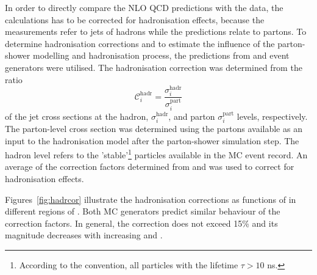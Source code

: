 In order to directly compare the NLO QCD predictions with the data, the calculations has to be corrected for hadronisation effects, because the measurements refer to jets of hadrons while the predictions relate to partons. To determine hadronisation corrections and to estimate the influence of the parton-shower modelling and hadronisation process, the predictions from \ariadne and \lepto event generators were utilised. The hadronisation correction was determined from the ratio 
\begin{equation}
 \mathcal{C}^\text{hadr}_i = \frac{\sigma_i^\text{hadr}}{\sigma_i^\text{part}}
 \label{eq:hadrcor}
\end{equation}
of the jet cross sections at the hadron, $\sigma_i^\text{hadr}$, and parton $\sigma_i^\text{part}$ levels, respectively. The parton-level cross section was determined using the partons available as an input to the hadronisation model after the parton-shower simulation step. The hadron level refers to the 'stable'\footnote{According to the \zeus convention, all particles with the lifetime $\tau > 10$ ns.} particles available in the MC event record. An average of the correction factors determined from \ariadne and \lepto was used to correct for hadronisation effects.

Figures~\ref{fig:hadrcor} illustrate the hadronisation corrections as functions of \etjetb in different regions of \qsq. Both MC generators predict similar behaviour of the correction factors. In general, the correction does not exceed 15\% and its magnitude decreases with increasing \etjetb and \qsq.



